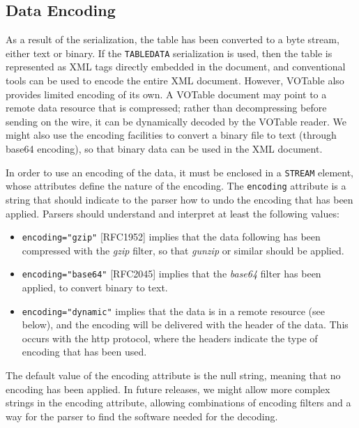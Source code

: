 \documentclass[11pt,a4paper]{ivoa}
\let\fg=\color
\def\attr#1{{\tt{\fg{DarkRed}#1}}}
\def\elem#1{{\tt{\fg{DarkRed}#1}}}
\def\attrval#1#2{{\tt{\fg{DarkRed}#1}="{\fg{DarkPurple}#2}"}}
\begin{document}
\subsection{Data Encoding}
\label{elem:STREAM}

As a result of the serialization, the table has been converted to
a byte stream, either text or binary. If the {\elem{TABLEDATA}}
serialization is used, then the table is represented as XML tags
directly  embedded in the document,
and conventional tools can be used to encode the entire XML document.
However, VOTable also provides limited encoding of its own.
A VOTable document may point to a remote data resource that is compressed;
rather than decompressing before sending on the wire, it can be dynamically
decoded by the VOTable reader. We might also use the encoding facilities to
convert a binary file to text (through base64 encoding), so that binary
data can be used in the XML document.

In order to use an encoding of the data, it must be enclosed in a
{\elem{STREAM}}
element, whose attributes define the nature of the encoding. The
{\attr{encoding}}
attribute is a string that should indicate to the parser how to undo
the encoding that has been applied. Parsers should understand and
interpret at least the following values:
\begin{itemize}
        \item {\attrval{encoding}{gzip}} [RFC1952]
        implies that the data following has been compressed with the {\em gzip}
        filter, so that {\em gunzip} or similar should be applied.
        \item {\attrval{encoding}{base64}} [RFC2045]
        implies that the {\em base64} filter has been applied, to convert binary
        to text.
        \item {\attrval{encoding}{dynamic}}
        implies that the data is in a remote resource (see below), and the
        encoding will be delivered with the header of the data.
        This occurs with the http protocol, where the headers indicate
        the type of encoding that has been used.
\end{itemize}

\noindent The default value of the encoding attribute is the null string,
meaning that no encoding has been
applied. In future releases, we might allow more complex strings in
the encoding attribute, allowing combinations of encoding filters and
a way for the parser to find the software needed for the decoding.
\end{document}
